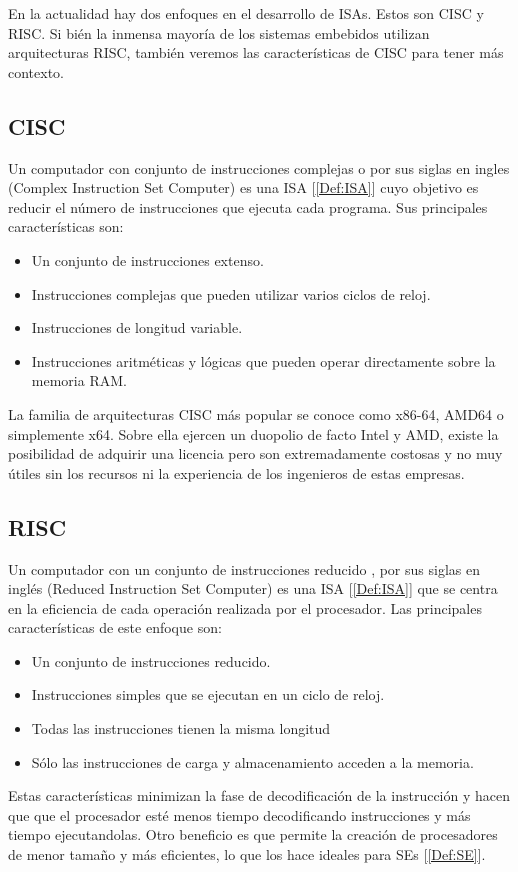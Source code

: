 En la actualidad hay dos enfoques en el desarrollo de ISAs. Estos son CISC y RISC. Si bién la inmensa mayoría de los sistemas embebidos utilizan arquitecturas RISC, también veremos las características de CISC para tener más contexto.

\subsection{CISC}
Un computador con conjunto de instrucciones complejas o  por sus siglas en ingles (Complex Instruction Set Computer) es una ISA [\ref{Def:ISA}] cuyo objetivo es reducir el número de instrucciones que ejecuta cada programa. Sus principales características son:
\begin{itemize}
    \item Un conjunto de instrucciones extenso.
    \item Instrucciones complejas que pueden utilizar varios ciclos de reloj.
    \item Instrucciones de longitud variable.
    \item Instrucciones aritméticas y lógicas que pueden operar directamente sobre la memoria RAM.
\end{itemize}

La familia de arquitecturas CISC más popular se conoce como x86-64, AMD64 o simplemente x64. Sobre ella ejercen un duopolio de facto Intel y AMD, existe la posibilidad de adquirir una licencia pero son extremadamente costosas y no muy útiles sin los recursos ni la experiencia de los ingenieros de estas empresas.

\subsection{RISC}
Un computador con un conjunto de instrucciones reducido , por sus siglas en inglés (Reduced Instruction Set Computer) es una ISA [\ref{Def:ISA}] que se centra en la eficiencia de cada operación realizada por el procesador. Las principales características de este enfoque son:
\begin{itemize}
    \item Un conjunto de instrucciones reducido.
    \item Instrucciones simples que se ejecutan en un ciclo de reloj.
    \item Todas las instrucciones tienen la misma longitud
    \item Sólo las instrucciones de carga y almacenamiento acceden a la memoria.
\end{itemize}
Estas características minimizan la fase de decodificación de la instrucción y hacen que que el procesador esté menos tiempo decodificando instrucciones y más tiempo ejecutandolas. Otro beneficio es que permite la creación de procesadores de menor tamaño y más eficientes, lo que los hace ideales para SEs [\ref{Def:SE}]. 

